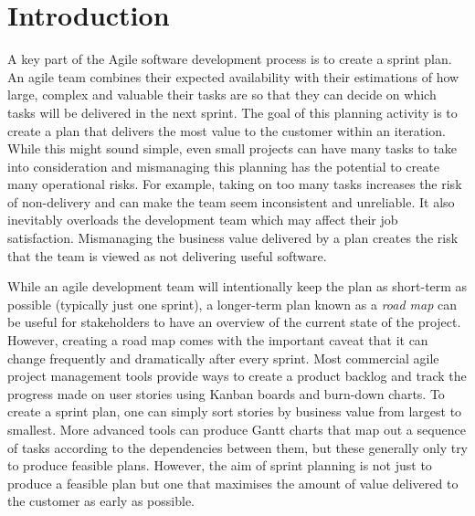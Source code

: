 
\chapter{Introduction} %

\label{ChapterIntroduction}

A key part of the Agile software development process is to create a sprint plan. An agile team combines their expected availability with their estimations of how large, complex and valuable their tasks are so that they can decide on which tasks will be delivered in the next sprint. The goal of this planning activity is to create a plan that delivers the most value to the customer within an iteration. While this might sound simple, even small projects can have many tasks to take into consideration and mismanaging this planning has the potential to create many operational risks. For example, taking on too many tasks increases the risk of non-delivery and can make the team seem inconsistent and unreliable. It also inevitably overloads the development team which may affect their job satisfaction. Mismanaging the business value delivered by a plan creates the risk that the team is viewed as not delivering useful software.

While an agile development team will intentionally keep the plan as short-term as possible (typically just one sprint), a longer-term plan known as a \emph{road map} can be useful for stakeholders to have an overview of the current state of the project. However, creating a road map comes with the important caveat that it can change frequently and dramatically after every sprint. Most commercial agile project management tools provide ways to create a product backlog and track the progress made on user stories using Kanban boards and burn-down charts. To create a sprint plan, one can simply sort stories by business value from largest to smallest. More advanced tools can produce Gantt charts that map out a sequence of tasks according to the dependencies between them, but these generally only try to produce feasible plans. However, the aim of sprint planning is not just to produce a feasible plan but one that maximises the amount of value delivered to the customer as early as possible.

